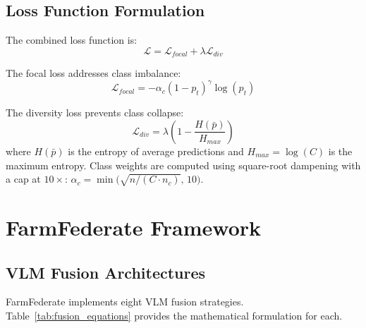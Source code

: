 \documentclass[10pt,journal,compsoc]{IEEEtran}
\begin{document}
\subsection{Loss Function Formulation}

The combined loss function is:
\begin{equation}
    \mathcal{L} = \mathcal{L}_{focal} + \lambda \mathcal{L}_{div}
    \label{eq:combined_loss}
\end{equation}

The focal loss addresses class imbalance:
\begin{equation}
    \mathcal{L}_{focal} = -\alpha_c (1-p_t)^\gamma \log(p_t)
    \label{eq:focal_loss}
\end{equation}

The diversity loss prevents class collapse:
\begin{equation}
    \mathcal{L}_{div} = \lambda \left(1 - \frac{H(\bar{p})}{H_{max}}\right)
    \label{eq:diversity_loss}
\end{equation}
where $H(\bar{p})$ is the entropy of average predictions and $H_{max} = \log(C)$ is the maximum entropy. Class weights are computed using square-root dampening with a cap at $10\times$: $\alpha_c = \min\!\big(\sqrt{n / (C \cdot n_c)},\, 10\big)$.

\section{FarmFederate Framework}
\label{sec:method}

\subsection{VLM Fusion Architectures}

FarmFederate implements eight VLM fusion strategies. Table~\ref{tab:fusion_equations} provides the mathematical formulation for each.
\end{document}
